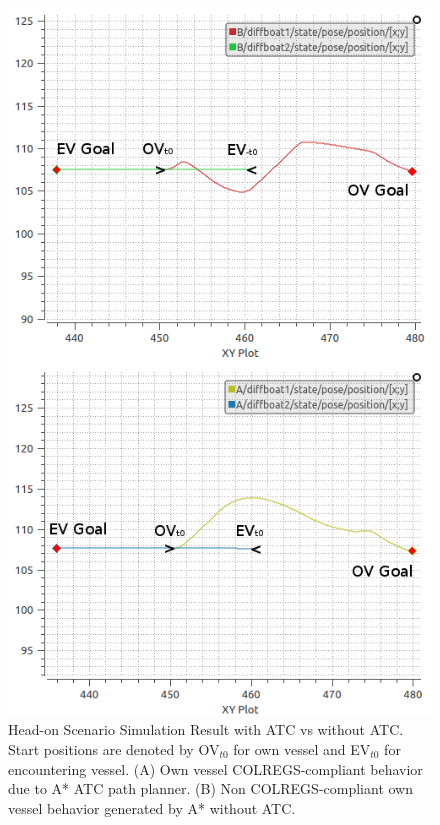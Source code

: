         \begin{figure}[H]
            \centering
            \includegraphics[scale=0.50]{figs/Result_HeadOn_With_Without_ATC.png}
            \caption{Head-on Scenario Simulation Result with \ac{ATC} vs without \ac{ATC}. Start positions are denoted by OV$_{t0}$ for own vessel and EV$_{t0}$ for encountering vessel. (A) Own vessel COLREGS-compliant behavior due to A* \ac{ATC} path planner. (B) Non COLREGS-compliant own vessel behavior generated by A* without \ac{ATC}.}
            \label{fig:Result_HeadOn_With_Without_ATC}
        \end{figure}
        
